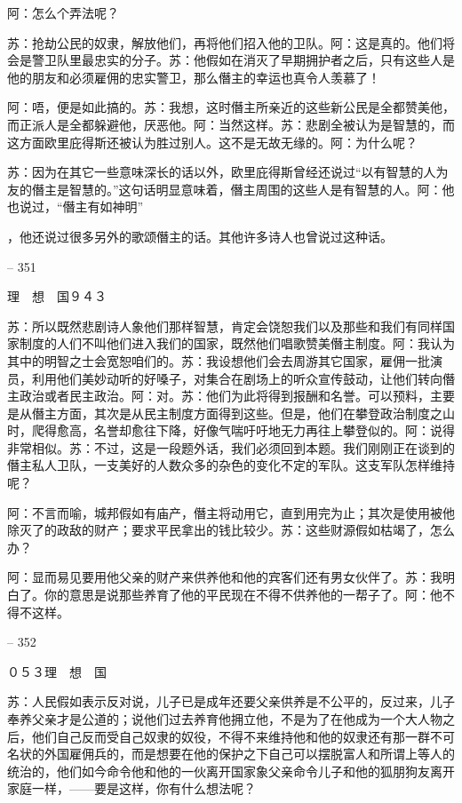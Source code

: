 \documentclass[11pt,oneside]{book}
\begin{document}
\begin{common-format}
    阿：怎么个弄法呢？

    苏：抢劫公民的奴隶，解放他们，再将他们招入他的卫队。阿：这是真的。他们将会是警卫队里最忠实的分子。苏：他假如在消灭了早期拥护者之后，只有这些人是他的朋友和必须雇佣的忠实警卫，那么僭主的幸运也真令人羡慕了！

    阿：唔，便是如此搞的。苏：我想，这时僭主所亲近的这些新公民是全都赞美他，而正派人是全都躲避他，厌恶他。阿：当然这样。苏：悲剧全被认为是智慧的，而这方面欧里庇得斯还被认为胜过别人。这不是无故无缘的。阿：为什么呢？

    苏：因为在其它一些意味深长的话以外，欧里庇得斯曾经还说过“以有智慧的人为友的僭主是智慧的。”这句话明显意味着，僭主周围的这些人是有智慧的人。阿：他也说过，“僭主有如神明”

    ，他还说过很多另外的歌颂僭主的话。其他许多诗人也曾说过这种话。

    

-- 351

    理　想　国９４３

    苏：所以既然悲剧诗人象他们那样智慧，肯定会饶恕我们以及那些和我们有同样国家制度的人们不叫他们进入我们的国家，既然他们唱歌赞美僭主制度。阿：我认为其中的明智之士会宽恕咱们的。苏：我设想他们会去周游其它国家，雇佣一批演员，利用他们美妙动听的好嗓子，对集合在剧场上的听众宣传鼓动，让他们转向僭主政治或者民主政治。阿：对。苏：他们为此将得到报酬和名誉。可以预料，主要是从僭主方面，其次是从民主制度方面得到这些。但是，他们在攀登政治制度之山时，爬得愈高，名誉却愈往下降，好像气喘吁吁地无力再往上攀登似的。阿：说得非常相似。苏：不过，这是一段题外话，我们必须回到本题。我们刚刚正在谈到的僭主私人卫队，一支美好的人数众多的杂色的变化不定的军队。这支军队怎样维持呢？

    阿：不言而喻，城邦假如有庙产，僭主将动用它，直到用完为止；其次是使用被他除灭了的政敌的财产；要求平民拿出的钱比较少。苏：这些财源假如枯竭了，怎么办？

    阿：显而易见要用他父亲的财产来供养他和他的宾客们还有男女伙伴了。苏：我明白了。你的意思是说那些养育了他的平民现在不得不供养他的一帮子了。阿：他不得不这样。

    

-- 352

    ０５３理　想　国

    苏：人民假如表示反对说，儿子已是成年还要父亲供养是不公平的，反过来，儿子奉养父亲才是公道的；说他们过去养育他拥立他，不是为了在他成为一个大人物之后，他们自己反而受自己奴隶的奴役，不得不来维持他和他的奴隶还有那一群不可名状的外国雇佣兵的，而是想要在他的保护之下自己可以摆脱富人和所谓上等人的统治的，他们如今命令他和他的一伙离开国家象父亲命令儿子和他的狐朋狗友离开家庭一样，——要是这样，你有什么想法呢？


\end{common-format}
\end{document}
